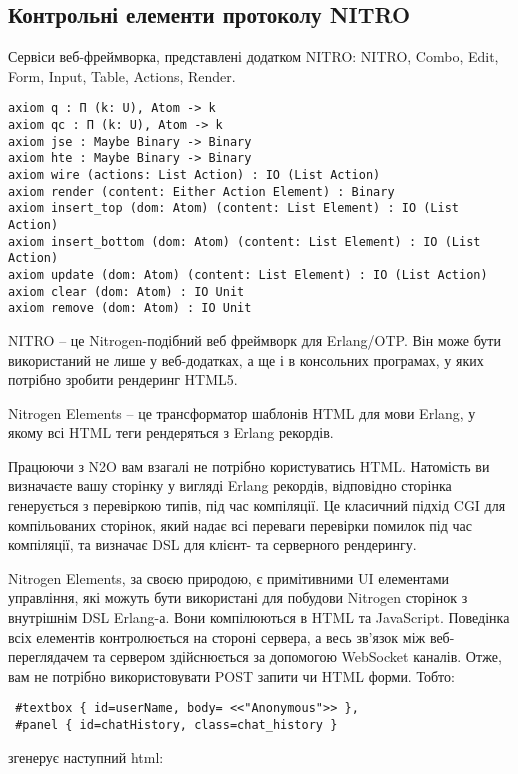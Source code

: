 \subsection{Контрольні елементи протоколу NITRO}
Сервіси веб-фреймворка, представлені додатком NITRO: NITRO, Combo,
Edit, Form, Input, Table, Actions, Render.

\begin{lstlisting}
axiom q : Π (k: U), Atom -> k
axiom qc : Π (k: U), Atom -> k
axiom jse : Maybe Binary -> Binary
axiom hte : Maybe Binary -> Binary
axiom wire (actions: List Action) : IO (List Action)
axiom render (content: Either Action Element) : Binary
axiom insert_top (dom: Atom) (content: List Element) : IO (List Action)
axiom insert_bottom (dom: Atom) (content: List Element) : IO (List Action)
axiom update (dom: Atom) (content: List Element) : IO (List Action)
axiom clear (dom: Atom) : IO Unit
axiom remove (dom: Atom) : IO Unit
\end{lstlisting}

NITRO – це Nitrogen-подібний веб фреймворк для Erlang/OTP.
Він може бути використаний не лише у веб-додатках, а ще
і в консольних програмах, у яких потрібно зробити рендеринг HTML5.

Nitrogen Elements – це трансформатор шаблонів HTML для
мови Erlang, у якому всі HTML теги рендеряться з Erlang рекордів.

Працюючи з N2O вам взагалі не потрібно користуватись HTML.
Натомість ви визначаєте вашу сторінку у вигляді
Erlang рекордів, відповідно сторінка генерується
з перевіркою типів, під час компіляції. Це класичний
підхід CGI для компільованих сторінок, який надає всі
переваги перевірки помилок під час компіляції,
та визначає DSL для клієнт- та серверного рендерингу.

Nitrogen Elements, за своєю природою, є примітивними UI
елементами управління, які можуть бути використані для
побудови Nitrogen сторінок з внутрішнім DSL Erlang-а.
Вони компілюються в HTML та JavaScript. Поведінка всіх
елементів контролюється на стороні сервера, а весь
зв'язок між веб-переглядачем та сервером здійснюється
за допомогою WebSocket каналів. Отже, вам не потрібно
використовувати POST запити чи HTML форми. Тобто:

\begin{lstlisting}
 #textbox { id=userName, body= <<"Anonymous">> },
 #panel { id=chatHistory, class=chat_history }
\end{lstlisting}

згенерує наступний html:

